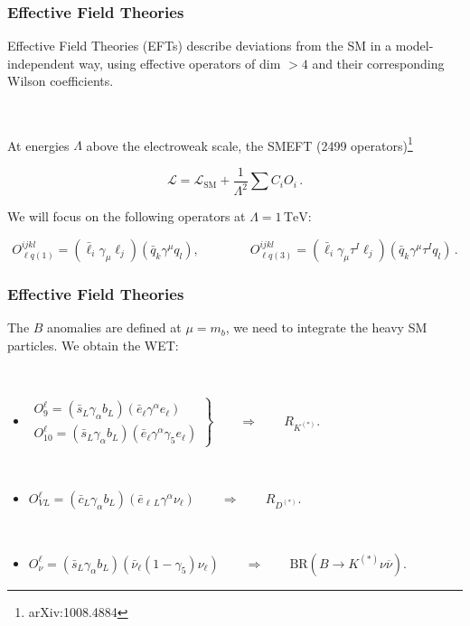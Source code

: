 \documentclass[mathserif, 10pt]{beamer}
\begin{document}
\begin{frame}
    \frametitle{Effective Field Theories}

    Effective Field Theories (EFTs) describe deviations from the SM in a model-independent way, using effective operators of dim $>4$ and their corresponding Wilson coefficients.

    ~

    At energies $\Lambda$ above the electroweak scale, the SMEFT (2499 operators)\footnote[1]{arXiv:1008.4884}

    $$\mathcal{L} = \mathcal{L}_\mathrm{SM} + \frac{1}{\Lambda^2}\sum C_i O_i\,.$$

    We will focus on the following operators at $\Lambda = 1\,\mathrm{TeV}$:

    $$O_{\ell q(1)}^{ijkl} = (\bar{\ell}_i \gamma_\mu \ell_j)(\bar{q}_k \gamma^\mu  q_l),\qquad\qquad O_{\ell q(3)}^{ijkl}= (\bar{\ell}_i \gamma_\mu \tau^I \ell_j)(\bar{q}_k \gamma^\mu \tau^I q_l)\,.$$

\end{frame}

\begin{frame}

    \frametitle{Effective Field Theories}
    The $B$ anomalies are defined at $\mu=m_b$, we need to integrate the heavy SM particles. We obtain the WET:

    ~

    \begin{itemize}
        \item $\left.\begin{matrix}
                      O_9^\ell = (\bar{s}_L \gamma_\alpha b_L)(\bar{e}_\ell \gamma^\alpha e_\ell) \\
                      O_{10}^\ell = (\bar{s}_L \gamma_\alpha b_L)(\bar{e}_\ell \gamma^\alpha \gamma_5 e_\ell)
                  \end{matrix}\right\} \qquad \Longrightarrow \qquad R_{K^{(*)}}$.

              ~

        \item $O_{VL}^\ell = (\bar{c}_L \gamma_\alpha b_L)(\bar{e}_{\ell\,L} \gamma^\alpha \nu_\ell) \qquad\Longrightarrow\qquad R_{D^{(*)}}$.

              ~

        \item $O_\nu^\ell = (\bar{s}_L \gamma_\alpha b_L)(\bar{\nu}_\ell (1-\gamma_5) \nu_\ell) \qquad\Longrightarrow \qquad \mathrm{BR}(B\to K^{(*)}\nu\overline{\nu})$.
    \end{itemize}



\end{frame}
\end{document}
